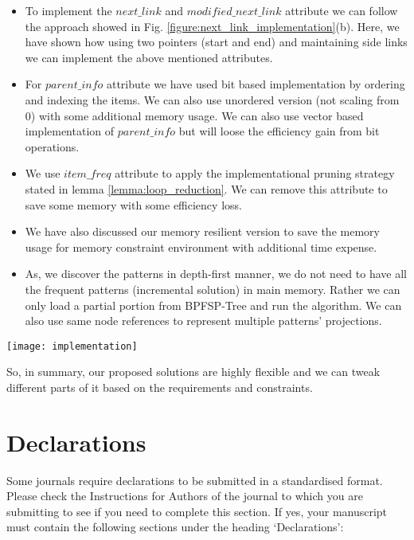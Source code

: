 \begin{itemize}
    \item To implement the $next\_link$ and $modified\_next\_link$ attribute we can follow the approach showed in Fig. \ref{figure:next_link_implementation}(b). Here, we have shown how using two pointers (start and end) and maintaining side links we can implement the above mentioned attributes. 
    \item For $parent\_info$ attribute we have used bit based implementation by ordering and indexing the items. We can also use unordered version (not scaling from 0) with some additional memory usage. We can also use vector based implementation of $parent\_info$ but will loose the efficiency gain from bit operations. 
    \item We use $item\_freq$ attribute to apply the implementational pruning strategy stated in lemma \ref{lemma:loop_reduction}. We can remove this attribute to save some memory with some efficiency loss. 
    \item We have also discussed our memory resilient version to save the memory usage for memory constraint environment with additional time expense. 
    \item As, we discover the patterns in depth-first manner, we do not need to have all the frequent patterns (incremental solution) in main memory. Rather we can only load a partial portion from BPFSP-Tree and run the algorithm. We can also use same node references to represent multiple patterns' projections. 
\end{itemize}


\begin{figure*}[!tb]
\centering
\texttt{[image: implementation]}
\caption{Implementation of $next\_link$(s)} \label{figure:next_link_implementation}
\hfil
\end{figure*}

So, in summary, our proposed solutions are highly flexible and we can tweak different parts of it based on the requirements and constraints. 



\section*{Declarations}

Some journals require declarations to be submitted in a standardised format. Please check the Instructions for Authors of the journal to which you are submitting to see if you need to complete this section. If yes, your manuscript must contain the following sections under the heading `Declarations':


